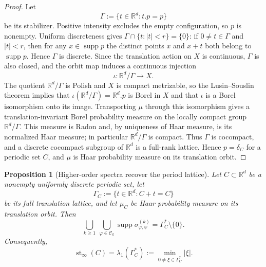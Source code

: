 \documentclass[11pt,reqno,a4paper]{amsart}
\numberwithin{equation}{section}
\theoremstyle{compact}
\newtheorem{proposition}[proposition]{Proposition}
\theoremstyle{definition}
\theoremstyle{definition}
\begin{document}
\begin{proof}
Let
\[
  \Gamma:=\{t\in\mathbb R^d:t.p=p\}
\]
be its stabilizer.  Positive intensity excludes the empty configuration, so
$p$ is nonempty.  Uniform discreteness gives
$\Gamma\cap\{t:|t|<r\}=\{0\}$: if $0\neq t\in\Gamma$ and $|t|<r$, then
for any $x\in\operatorname{supp}p$ the distinct points $x$ and $x+t$ both
belong to $\operatorname{supp}p$.  Hence $\Gamma$ is discrete.  Since the translation action on $X$ is
continuous, $\Gamma$ is also closed, and the orbit map induces a continuous
injection
\[
  \iota:\mathbb R^d/\Gamma\longrightarrow X.
\]
The quotient $\mathbb R^d/\Gamma$ is Polish and $X$ is compact metrizable,
so the Lusin--Souslin theorem implies that
$\iota(\mathbb R^d/\Gamma)=\mathbb R^d.p$ is Borel in $X$ and that
$\iota$ is a Borel isomorphism onto its image.  Transporting $\mu$ through
this isomorphism gives a translation-invariant Borel probability measure on
the locally compact group $\mathbb R^d/\Gamma$.  This measure is Radon and,
by uniqueness of Haar measure, is its normalized Haar measure; in particular
$\mathbb R^d/\Gamma$ is compact.  Thus $\Gamma$ is cocompact, and a
discrete cocompact subgroup of $\mathbb R^d$ is a full-rank lattice.  Hence
$p=\delta_C$ for a periodic set $C$, and $\mu$ is Haar probability measure
on its translation orbit.
\end{proof}

\begin{proposition}[Higher-order spectra recover the period lattice]
\label{prop:periodic-full-reciprocal-spectrum}
Let $C\subset\mathbb R^d$ be a nonempty uniformly discrete periodic set, let
\[
  \Gamma_C:=\{t\in\mathbb R^d:C+t=C\}
\]
be its full translation lattice, and let $\mu_C$ be Haar probability measure
on its translation orbit.  Then
\begin{equation}\label{eq:periodic-all-order-support}
  \bigcup_{k\geq1}\ \bigcup_{\varphi\in\mathcal C_k}
  \operatorname{supp}\sigma^{(k)}_{\varphi,\varphi}
  =\Gamma_C^*\setminus\{0\}.
\end{equation}
Consequently,
\begin{equation}\label{eq:all-order-stealth-period-lattice}
  \operatorname{st}_\infty(C)=\lambda_1(\Gamma_C^*)
  :=\min_{0\neq\xi\in\Gamma_C^*}|\xi|.
\end{equation}
\end{proposition}
\end{document}
